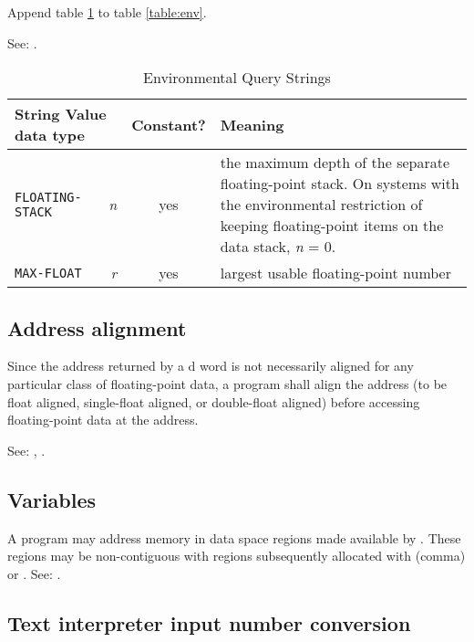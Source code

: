 Append table \ref{float:env} to table \ref{table:env}.

See: .

\begin{table}[ht]
  \begin{center}
	\caption{Environmental Query Strings}
	\label{float:env}
	\begin{tabular}{p{9em}rcp{}}
		\hline\hline
		\multicolumn{2}{l}{String \hfill Value data type} & Constant? & Meaning \\
		\hline
		\texttt{FLOATING-STACK} & \emph{n} & yes &
			the maximum depth of the separate floating-point stack.
			On systems with the environmental restriction of keeping
			floating-point items on the data stack, \emph{n} = 0. \\
		\texttt{MAX-FLOAT}		& \emph{r}			& yes	&
			largest usable floating-point number \\
		\hline\hline
	\end{tabular}
  \end{center}
\end{table}


\subsection{Address alignment} %

Since the address returned by a d word is not
necessarily aligned for any particular class of floating-point
data, a program shall align the address (to be float aligned,
single-float aligned, or double-float aligned) before accessing
floating-point data at the address.

See: ,
	.

\subsection{Variables} %

A program may address memory in data space regions made available
by . These regions may be non-contiguous with
regions subsequently allocated with \word[core]{,} (comma) or
. See: .

\subsection{Text interpreter input number conversion} %
\label{float:conv}

